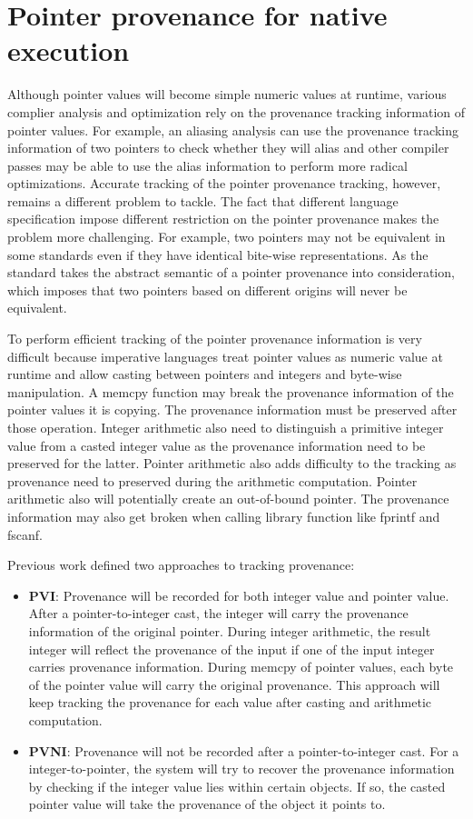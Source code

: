 \documentclass[sigplan, nonacm]{acmart}\settopmatter{printfolios=true,printccs=false,printacmref=false}
\begin{document}
\section{Pointer provenance for native execution}\label{nativeprovenance}
Although pointer values will become simple numeric values at runtime, various complier analysis and optimization rely on the provenance tracking information of pointer values. For example, an aliasing analysis can use the provenance tracking information of two pointers to check whether they will alias and other compiler passes may be able to use the alias information to perform more radical optimizations. Accurate tracking of the pointer provenance tracking, however, remains a different problem to tackle. The fact that different language specification impose different restriction on the pointer provenance makes the problem more challenging. For example, two pointers may not be equivalent in some standards even if they have identical bite-wise representations. As the standard takes the abstract semantic of a pointer provenance into consideration, which imposes that two pointers based on different origins will never be equivalent.\par
To perform efficient tracking of the pointer provenance information is very difficult because imperative languages treat pointer values as numeric value at runtime and allow casting between pointers and integers and byte-wise manipulation. A memcpy function may break the provenance information of the pointer values it is copying. The provenance information must be preserved after those operation. Integer arithmetic also need to distinguish a primitive integer value from a casted integer value as the provenance information need to be preserved for the latter. Pointer arithmetic also adds difficulty to the tracking as provenance need to preserved during the arithmetic computation. Pointer arithmetic also will potentially create an out-of-bound pointer. The provenance information may also get broken when calling library function like fprintf and fscanf.\par
Previous work\cite{memarian2019exploring} defined two approaches to tracking provenance:
\begin{itemize}
  \item \textbf{PVI}: Provenance will be recorded for both integer value and pointer value. After a pointer-to-integer cast, the integer will carry the provenance information of the original pointer. During integer arithmetic, the result integer will reflect the provenance of the input if one of the input integer carries provenance information. During memcpy of pointer values, each byte of the pointer value will carry the original provenance. This approach will keep tracking the provenance for each value after casting and arithmetic computation.
  \item \textbf{PVNI}: Provenance will not be recorded after a pointer-to-integer cast. For a integer-to-pointer, the system will try to recover the provenance information by checking if the integer value lies within certain objects. If so, the casted pointer value will take the provenance of the object it points to.
\end{itemize}
\end{document}
